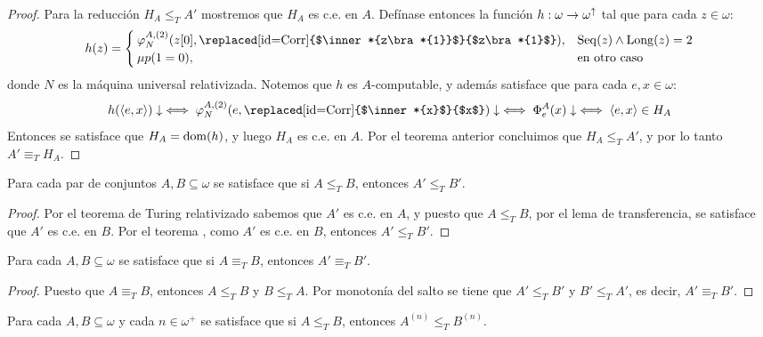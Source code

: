 \begin{agregado}
\begin{agregado}
\begin{proof}
	Para la reducción $H_{A}\leq_{T} A'$ mostremos que $H_{A}$ es c.e. en $A$. Defínase entonces la función $h:\omega\to\omega^{\uparrow}$ tal que para cada $z\in\omega$:
	\[
		h\pa*{z} =
		\begin{cases}
			\varphi_{N}^{A, (2)}\pa*{z\bra*{0},\mbox{\replaced[id=Corr]{$\inner*{z\bra*{1}}$}{$z\bra*{1}$}}}, &\SECUENCIAS\pa*{z}\land\LONGITUD\pa*{z} = 2\\
			\mu p\pa*{1 = 0}, &\text{en otro caso}
		\end{cases}
	\]
	donde $N$ es la máquina universal relativizada. Notemos que $h$ es $A$-computable, y además satisface que para cada $e, x\in\omega$:
	\[
		h\pa*{\inner*{e, x}}\ACABA\iff\varphi_{N}^{A, (2)}\pa*{e,\mbox{\replaced[id=Corr]{$\inner*{x}$}{$x$}}}\ACABA\iff\Phi_{e}^{A}\pa*{x}\ACABA\iff\inner*{e, x}\in H_{A}
	\]
	Entonces se satisface que $H_{A} =\DOMINIO{h}$, y luego $H_{A}$ es c.e. en $A$. Por el teorema anterior concluimos que $H_{A}\leq_{T} A'$, y por lo tanto $A'\equiv_{T} H_{A}$.
\end{proof}

\begin{theorem}
	\label{theo: monotonia_salto}
	Para cada par de conjuntos $A, B\subseteq\omega$ se satisface que si $A\leq_{T} B$, entonces $A'\leq_{T} B'$.
\end{theorem}

\begin{proof}
	Por el teorema de Turing relativizado sabemos que $A'$ es c.e. en $A$, y puesto que $A\leq_{T} B$, por el lema de transferencia, se satisface que $A'$ es c.e. en $B$. Por el teorema , como $A'$ es c.e. en $B$, entonces $A'\leq_{T} B'$.
\end{proof}

\begin{coll}
	\label{coll: invarianza_salto}
	Para cada $A, B\subseteq\omega$ se satisface que si $A\equiv_{T} B$, entonces $A'\equiv_{T} B'$.
\end{coll}

\begin{proof}
	Puesto que $A\equiv_{T} B$, entonces $A\leq_{T} B$ y $B\leq_{T} A$. Por monotonía del salto se tiene que $A'\leq_{T} B'$ y $B'\leq_{T} A'$, es decir, $A'\equiv_{T} B'$.
\end{proof}

\begin{coll}
	\label{coll: monotonia_saltos_iterados}
	Para cada $A, B\subseteq\omega$ y cada $n\in\omega^{+}$ se satisface que si $A\leq_{T} B$, entonces $A^{(n)}\leq_{T} B^{(n)}$.
\end{coll}


\end{agregado}
\end{agregado}
